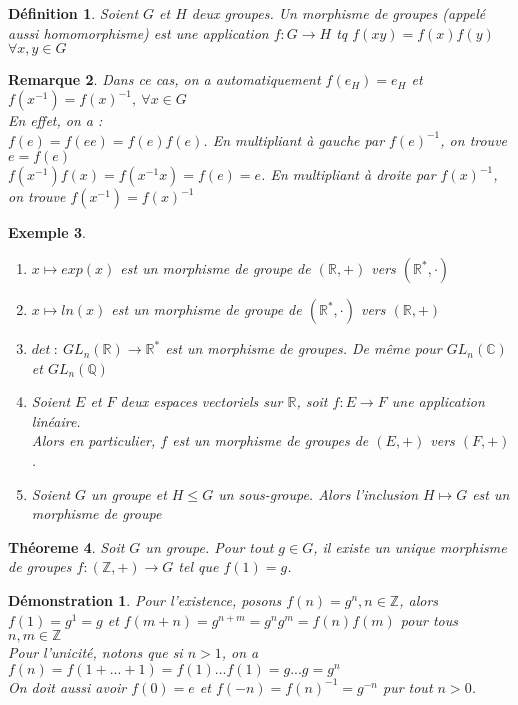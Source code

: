 \documentclass[a4paper, oneside]{report}
\theoremstyle{break}
\newtheorem{thm}{Théoreme}[section] %
\newtheorem{defi}[thm]{Définition}
\newtheorem{exem}[thm]{Exemple}
\newtheorem*{demo}{Démonstration}
\newtheorem{remar}[thm]{Remarque}
\newcommand{\R}{\mathbb{R}}
\newcommand{\C}{\mathbb{C}}
\newcommand{\Z}{\mathbb{Z}}
\newcommand{\Q}{\mathbb{Q}}
\newcommand{\mdg}{morphisme de groupes }
\begin{document}
\begin{defi}
	Soient $G$ et $H$ deux groupes. Un morphisme de groupes (appelé aussi homomorphisme) est une application $f:G\rightarrow H$ tq $f(xy)=f(x)f(y)$ $\forall x,y\in G$	
\end{defi}

\begin{remar}
	Dans ce cas, on a automatiquement $f(e_H)=e_H$ et $f(x^{-1})= f(x)^{-1},~\forall x\in G$\\
	En effet, on a :\\
	$f(e)=f(ee)=f(e)f(e)$. En multipliant à gauche par $f(e)^{-1}$, on trouve $e=f(e)$\\
	$f(x^{-1})f(x)=f(x^{-1}x)=f(e)=e$. En multipliant à droite par $f(x)^{-1}$, on trouve $f(x^{-1})=f(x)^{-1}$
\end{remar}

\begin{exem}
	\begin{enumerate}
		\item $x\mapsto exp(x)$ est un morphisme de groupe de $(\R,+)$ vers $(\R^*, \cdot)$
		\item $x\mapsto ln(x)$ est un morphisme de groupe de $(\R^*, \cdot)$ vers $(\R,+)$
		\item $det~:~GL_n(\R)\rightarrow \R^*$ est un morphisme de groupes. De même pour $GL_n(\C)$ et $GL_n(\Q)$
		\item Soient $E$ et $F$ deux espaces vectoriels sur $\R$, soit $f:E\rightarrow F$ une application linéaire.\\
		Alors en particulier, $f$ est un morphisme de groupes de $(E,+)$ vers $(F,+)$.
		\item Soient $G$ un groupe et $H\leq G$ un sous-groupe. Alors l'inclusion $H\mapsto G$ est un morphisme de groupe
	\end{enumerate}
\end{exem}

\begin{thm}
	Soit $G$ un groupe. Pour tout $g\in G$, il existe un unique \mdg $f:(\Z,+)\rightarrow G$ tel que $f(1)=g$.
\end{thm}

\begin{demo}
	Pour l'existence, posons $f(n)=g^n, n\in \Z$, alors $f(1)=g^1=g$ et $f(m+n)=g^{n+m}=g^ng^m=f(n)f(m)$ pour tous $n,m\in \Z$\\
	Pour l'unicité, notons que si $n>1$, on a $f(n)= f(1+...+1)=f(1)...f(1)=g...g=g^n$\\
	On doit aussi avoir $f(0)=e$ et $f(-n)=f(n)^{-1}=g^{-n}$ pur tout $n>0$.	
\end{demo}
\end{document}
